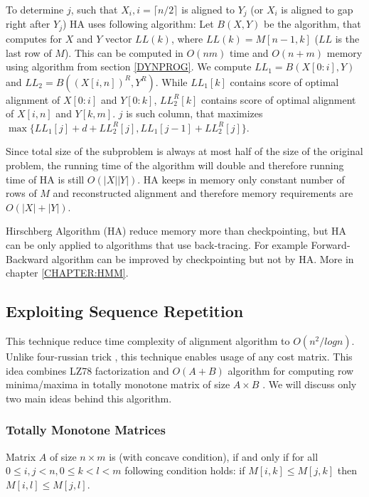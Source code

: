 To determine $j$, such that $X_i,i=\lceil n/2\rceil$ is aligned to $Y_j$ (or
$X_i$ is aligned to gap right after $Y_j$) HA uses following algorithm: Let
$B(X,Y)$ be the algorithm, that computes for $X$ and $Y$ vector $LL(k)$, where
$LL(k)=M[n-1,k]$ ($LL$ is the last row of $M$). This can be computed in
$O(nm)$ time and $O(n+m)$ memory using algorithm from section
\ref{DYNPROG}.  We compute $LL_1=B(X[0:i],Y)$ and $LL_2=B( (X[i,n])^R,Y^R)$.
While $LL_1[k]$ contains score of optimal alignment of $X[0:i]$ and $Y[0:k]$,
$LL_2^R[k]$ contains score of optimal alignment of $X[i,n]$ and $Y[k,m]$.
$j$ is such column, that maximizes $\max\{LL_1[j]+d+LL_2^R[j],
LL_1[j-1]+LL_2^R[j] \}$.

Since total size of the subproblem is always at most half of the size of the
original problem, the running time of the algorithm will double and therefore
running time of HA is still $O(|X||Y|)$. HA keeps in memory only constant number
of rows of $M$ and reconstructed alignment and therefore memory requirements are
$O(|X|+|Y|)$.

Hirschberg Algorithm (HA) reduce memory more than checkpointing, but HA can be
only applied to algorithms that use back-tracing. For example Forward-Backward
algorithm can be improved by checkpointing but not by HA. More in chapter
\ref{CHAPTER:HMM}.

 
\subsection{Exploiting Sequence Repetition}

This technique reduce time complexity of alignment algorithm to $O(n^2/log n)$.
Unlike four-russian trick \cite{GusfieldBook}, this technique enables usage of
any cost matrix.  This idea combines LZ78 factorization \cite{Lempel1976} and
$O(A+B)$ algorithm for computing row minima/maxima in totally monotone matrix of
size $A\times B$ \cite{Aggarwal1987}. We will discuss only two main ideas behind
this algorithm.

\subsubsection{Totally Monotone Matrices}

\begin{definition}\cite{Crochemore2002}
Matrix $A$ of size $n\times m$ is  (with concave condition),
if and only if for all $0\leq i,j< n, 0\leq k<l<m$ following condition holds:
if $M[i,k]\leq M[j,k]$ then $M[i,l]\leq M[j,l]$.
\end{definition}

